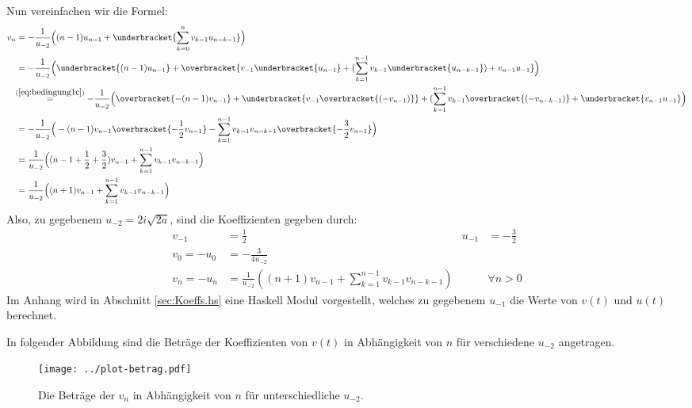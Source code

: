 \begin{comment}
und analog, für $n=1$ und $n=2$
\begin{align*}
v_1&= -\frac{3}{2u_{-2}^2} = \frac{3}{16a} = -u_1 &\mbox{und}
  & & v_2&= -\frac{63}{16u_{-2}^3} = -\frac{63i}{256a\sqrt{2a}} = -u_2 \,.
\end{align*}
Die letzten zwei Paare sind für die Berechnung nicht von bedeutung und dienen
nur dazu, das Programm zu prüfen.
\end{comment}
Nun vereinfachen wir die Formel:
\begin{align*}
v_{n} &= -\frac{1}{u_{-2}}
  \Big((n-1)u_{n-1} + \underbracket{\sum_{k=0}^{n} v_{k-1}u_{n-k-1}}\Big)
\\&= -\frac{1}{u_{-2}}
  \Big(\underbracket{(n-1)u_{n-1}} + \overbracket{v_{-1}\underbracket{u_{n-1}}
  + (\sum_{k=1}^{n-1} v_{k-1}\underbracket{u_{n-k-1}}) + v_{n-1}u_{-1}}\Big)
\\&\!\!\overset{(\ref{eq:bedingung1c})}{=} -\frac{1}{u_{-2}}
  \Big(\overbracket{-(n-1)v_{n-1}} + \underbracket{v_{-1}\overbracket{(-v_{n-1})}}
  + (\sum_{k=1}^{n-1} v_{k-1}\overbracket{(-v_{n-k-1})}
  + \underbracket{v_{n-1}u_{-1}}\Big)
\\&= -\frac{1}{u_{-2}} \Big(-(n-1)v_{n-1} \overbracket{-\frac{1}{2}v_{n-1}}
  - \sum_{k=1}^{n-1} v_{k-1}v_{n-k-1} \overbracket{- \frac{3}{2} v_{n-1}}\Big)
\\&= \frac{1}{u_{-2}} \Big((n-1+\frac{1}{2}+\frac{3}{2})v_{n-1}
  + \sum_{k=1}^{n-1} v_{k-1}v_{n-k-1}\Big)
\\&= \frac{1}{u_{-2}} \Big((n+1)v_{n-1} + \sum_{k=1}^{n-1} v_{k-1}v_{n-k-1}\Big)
\end{align*}
Also, zu gegebenem $u_{-2}=2i\sqrt{2a}$, sind die Koeffizienten gegeben durch:
\begin{align*}
v_{-1}&=\frac{1}{2} & u_{-1}&=-\frac{3}{2}
\\v_{0} = -u_{0} &= -\frac{3}{4u_{-2}}
\\v_n = - u_n &= \frac{1}{u_{-2}}
  \left((n+1)v_{n-1} + \sum_{k=1}^{n-1} v_{k-1}v_{n-k-1}\right)
  & & \forall n > 0
\end{align*}
Im Anhang wird in Abschnitt \ref{sec:Koeffs.hs} eine Haskell Modul vorgestellt,
welches zu gegebenem $u_{-1}$ die Werte von $v(t)$ und $u(t)$ berechnet.

In folgender Abbildung sind die Beträge der Koeffizienten von $v(t)$ in
Abhängigkeit von $n$ für verschiedene $u_{-2}$ angetragen.
\begin{figure}[htbp]
  \centering
  \texttt{[image: ../plot-betrag.pdf]}
  \caption%
   {Die Beträge der $v_n$ in Abhängigkeit von $n$ für unterschiedliche
     $u_{-2}$.}
  \label{fig:plotKoeffs}
\end{figure}

